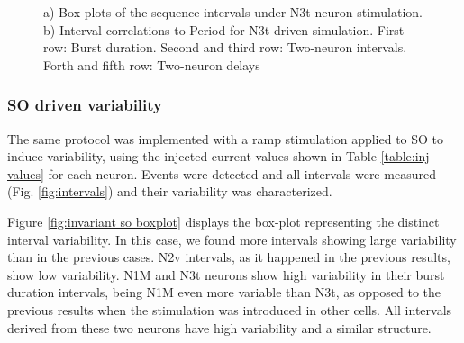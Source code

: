 \begin{figure}[hbt!]
\begin{minipage}[b]{0.53\textwidth}
\begin{minipage}[b]{\textwidth}
		\end{minipage}
	\end{minipage}
	\caption{a) Box-plots of the sequence intervals under N3t neuron stimulation. b) Interval correlations to Period for N3t-driven simulation. First row: Burst duration. Second and third row: Two-neuron intervals. Forth and fifth row: Two-neuron delays}
	\label{fig:invariant n3t test17}
\end{figure}





\subsubsection{SO driven variability}

The same protocol was implemented with a ramp stimulation applied to SO to induce variability, using the injected current values shown in Table \ref{table:inj values} for each neuron. Events were detected and all intervals were measured (Fig. \ref{fig:intervals}) and their variability was characterized. %

Figure \ref{fig:invariant so boxplot} displays the box-plot representing the distinct interval variability. In this case, we found more intervals showing large variability than in the previous cases. N2v intervals, as it happened in the previous results, show low variability. %
N1M and N3t neurons show high variability in their burst duration intervals, being N1M even more variable than N3t, as opposed to the previous results when the stimulation was introduced in other cells. All intervals derived from these two neurons have high variability and a similar structure. %




